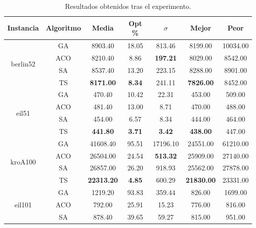 \begin{table}[H]
    \renewcommand{\arraystretch}{1.3}
    \caption{Resultados obtenidos tras el experimento.}
    \label{tab:exp_results}
    \begin{center}
        \begin{tabular}{|c|c|c|c|c|c|c|}
            \hline
            \textbf{Instancia} & \textbf{Algoritmo} & \textbf{Media} &
            \textbf{Opt \%} & \textbf{$\sigma$} & \textbf{Mejor} &
            \textbf{Peor} \\
            \hline
            \multirow{4}{*}{berlin52} & GA & 8903.40 & 18.05 & 813.46 & 8199.00 & 10034.00 \\
            \cline{2-7}
            & ACO & 8210.40 & 8.86 & \textbf{197.21} & 8029.00 & 8542.00 \\
            \cline{2-7}
            & SA & 8537.40 & 13.20 & 223.15 & 8288.00 & 8901.00 \\
            \cline{2-7}
            & TS & \textbf{8171.00} & \textbf{8.34} & 241.11 & \textbf{7826.00} & 8452.00 \\
            \hline
            \multirow{4}{*}{eil51} & GA & 470.40 & 10.42 & 22.31 & 453.00 & 509.00 \\
            \cline{2-7}
            & ACO & 481.40 & 13.00 & 8.71 & 470.00 & 488.00 \\
            \cline{2-7}
            & SA & 454.00 & 6.57 & 8.34 & 444.00 & 464.00 \\
            \cline{2-7}
            & TS & \textbf{441.80} & \textbf{3.71} & \textbf{3.42} & \textbf{438.00} & 447.00 \\
            \hline
            \multirow{4}{*}{kroA100} & GA & 41608.40 & 95.51 & 17196.10 & 24551.00 & 61210.00 \\
            \cline{2-7}
            & ACO & 26504.00 & 24.54 & \textbf{513.32} & 25909.00 & 27140.00 \\
            \cline{2-7}
            & SA & 26857.00 & 26.20 & 918.93 & 25562.00 & 27878.00 \\
            \cline{2-7}
            & TS & \textbf{22313.20} & \textbf{4.85} & 600.29 & \textbf{21830.00} & 23331.00 \\
            \hline
            \multirow{4}{*}{eil101} & GA & 1219.20 & 93.83 & 359.44 & 826.00 & 1699.00\\
            \cline{2-7}
            & ACO & 792.00 & 25.91 & 15.23 & 776.00 & 816.00 \\
            \cline{2-7}
            & SA & 878.40 & 39.65 & 59.27 & 815.00 & 951.00 \\

\end{tabular}
\end{center}
\end{table}
